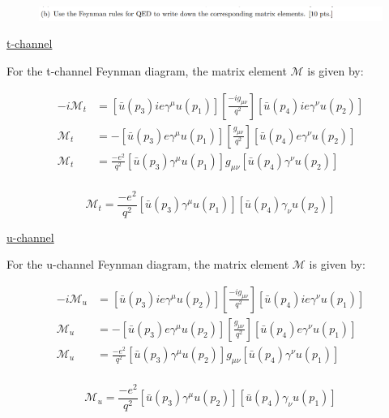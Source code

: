 \documentclass[11pt]{article}
\theoremstyle{definition}
\numberwithin{equation}{section}
\begin{document}
\newpage



\begin{figure}[H]
    \centering
    \includegraphics[scale = 0.4]{2b.png}
\end{figure}

\underline{t-channel}

For the t-channel Feynman diagram, the matrix element $\mathcal{M}$ is given by:

\begin{align}
    -i\mathcal{M}_{t} &= [\bar{u}(p_3)ie\gamma^{\mu}u(p_1)] 
    \left[ \frac{-ig_{\mu\nu}}{q^2} \right]
    [\bar{u}(p_4)ie\gamma^{\nu}u(p_2)]\\
    \mathcal{M}_{t} &= -[\bar{u}(p_3)e\gamma^{\mu}u(p_1)] 
    \left[ \frac{g_{\mu\nu}}{q^2} \right]
    [\bar{u}(p_4)e\gamma^{\nu}u(p_2)]\\
    \mathcal{M}_{t} &= \frac{-e^2}{q^2} [\bar{u}(p_3)\gamma^{\mu}u(p_1)]
    g_{\mu\nu}[\bar{u}(p_4)\gamma^{\nu}u(p_2)]\\
\end{align}

\begin{equation}
\boxed{
    \mathcal{M}_{t} = \frac{-e^2}{q^2} [\bar{u}(p_3)\gamma^{\mu}u(p_1)]
    [\bar{u}(p_4)\gamma_{\nu}u(p_2)]
}
\end{equation}

\underline{u-channel}

For the u-channel Feynman diagram, the matrix element $\mathcal{M}$ is given by:

\begin{align}
    -i\mathcal{M}_{u} &= [\bar{u}(p_3)ie\gamma^{\mu}u(p_2)] 
    \left[ \frac{-ig_{\mu\nu}}{q^2} \right]
    [\bar{u}(p_4)ie\gamma^{\nu}u(p_1)]\\
    \mathcal{M}_{u} &= -[\bar{u}(p_3)e\gamma^{\mu}u(p_2)] 
    \left[ \frac{g_{\mu\nu}}{q^2} \right]
    [\bar{u}(p_4)e\gamma^{\nu}u(p_1)]\\
    \mathcal{M}_{u} &= \frac{-e^2}{q^2} [\bar{u}(p_3)\gamma^{\mu}u(p_2)]
    g_{\mu\nu}[\bar{u}(p_4)\gamma^{\nu}u(p_1)]\\
\end{align}

\begin{equation}
\boxed{
    \mathcal{M}_{u} = \frac{-e^2}{q^2} [\bar{u}(p_3)\gamma^{\mu}u(p_2)]
    [\bar{u}(p_4)\gamma_{\nu}u(p_1)]
}
\end{equation}




\end{document}
